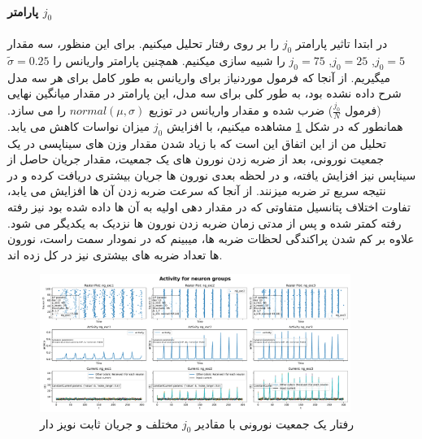 \documentclass{report}
\begin{document}
            \paragraph{پارامتر $j_0$}
                در ابتدا تاثیر پارامتر 
                $j_0$
                را بر روی رفتار تحلیل میکنیم. برای این منظور، سه مقدار 
                $j_0=5$,
                $j_0=25$,
                $j_0=75$
                را شبیه سازی میکنیم. همچنین پارامتر واریانس را 
                $\tilde{\sigma}=0.25$ 
                میگیریم. از آنجا که فرمول موردنیاز برای واریانس به طور کامل برای هر سه مدل شرح داده نشده بود، به طور کلی برای سه مدل، این پارامتر در مقدار میانگین نهایی
                (فرمول $\frac{j_0}{N}$) 
                ضرب شده و مقدار واریانس در توزیع 
                $normal(\mu,\sigma)$ 
                را می سازد.
                همانطور که در شکل 
                \ref{fig:part2-one-ng-full-synapse-diff-j}
                مشاهده میکنیم، با افزایش 
                $j_0$ 
                میزان نواسات کاهش می یابد. تحلیل من از این اتفاق این است که با زیاد شدن مقدار وزن های سیناپسی در یک جمعیت نورونی، بعد از ضربه زدن نورون های یک جمعیت، مقدار جریان حاصل از سیناپس نیز افزایش یافته، و در لحظه بعدی نورون ها جریان بیشتری دریافت کرده و در نتیجه سریع تر ضربه میزنند. از آنجا که سرعت ضربه زدن آن ها افزایش می یابد، تفاوت اختلاف پتانسیل متفاوتی که در مقدار دهی اولیه به آن ها داده شده بود نیز رفته رفته کمتر شده و پس از مدتی زمان ضربه زدن نورون ها نزدیک به یکدیگر می شود. علاوه بر کم شدن پراکندگی لحظات ضربه ها، میبینم که در نمودار سمت راست، نورون ها تعداد ضربه های بیشتری نیز در کل زده اند.
                \begin{figure}[!ht]
                    \centering
                    \includegraphics[width=0.9\textwidth]{plots/part2-one-ng-full-synapse-diff-j.pdf} 
                    \caption{رفتار یک جمعیت نورونی با مقادیر $j_0$ مختلف و جریان ثابت نویز دار}
                    \label{fig:part2-one-ng-full-synapse-diff-j}
                \end{figure}
\end{document}
